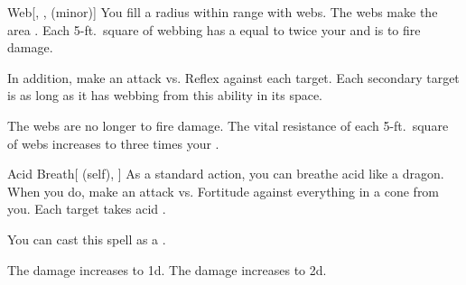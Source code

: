 \lowercase{\hypertarget{spell:Web}{}}\label{spell:Web}
\begin{freeability}[Rank 3]{\hypertarget{spell:Web}{Web}}[, ,  (minor)]
You fill a \areasmall radius  within \rngmed range with webs.
The webs make the area .
Each 5-ft.\ square of webbing has a  equal to twice your  and is  to fire damage.

In addition, make an attack vs. Reflex against each target.
\hit Each secondary target is  as long as it has webbing from this ability in its space.

\rankline
{} The webs are no longer  to fire damage.
 The vital resistance of each 5-ft.\ square of webs increases to three times your .

\end{freeability}
\vspace{0.25em}



\lowercase{\hypertarget{spell:Acid Breath}{}}\label{spell:Acid Breath}
\begin{attuneability}[Rank 4]{\hypertarget{spell:Acid Breath}{Acid Breath}}[ (self), ]
As a standard action, you can breathe acid like a dragon.
When you do, make an attack vs. Fortitude against everything in a \arealarge cone from you.
\hit Each target takes acid .

You can cast this spell as a .

\rankline
{} The damage increases to  \plus1d.
 The damage increases to  \plus2d.

\end{attuneability}
\vspace{0.25em}




